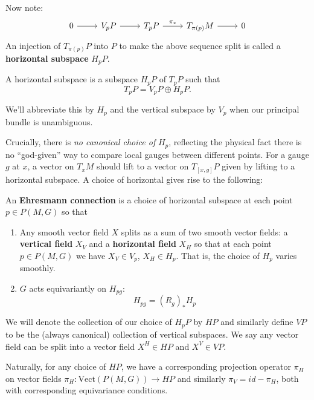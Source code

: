 		Now note:
		\[
		\begin{tikzcd}
			0 \arrow{r} & V_p P \arrow{r} & T_p P \arrow[r,"\pi_*"] & T_{\pi(p)}M \arrow{r} & 0
		\end{tikzcd}	
		\]
		An injection of $T_{\pi(p)} P$ into $P$ to make the above sequence split is called a \textbf{horizontal subspace} $H_pP$. 
		\begin{defn}
			A horizontal subspace is a subspace $H_p P$ of $T_p P$ such that
			\begin{equation}
				T_p P = V_p P \oplus H_p P.
			\end{equation}
		\end{defn}
		 We'll abbreviate this by $H_p$ and the vertical subspace by $V_p$ when our principal bundle is unambiguous.
	 
		Crucially, there is \emph{no canonical choice of} $H_p$, reflecting the physical fact there is no ``god-given'' way to compare local gauges between different points. For a gauge $g$ at $x$, a vector on $T_x M$ should lift to a vector on $T_{[x,g]} P$ given by lifting to a horizontal subspace. A choice of horizontal gives rise to the following:
		\begin{defn}
		An \textbf{Ehresmann connection} is a choice of horizontal subspace at each point $p \in P(M,G)$ so that
			\begin{enumerate}
				\item Any smooth vector field $X$ splits as a sum of two smooth vector fields: a \textbf{vertical field} $X_V$ and a \textbf{horizontal field} $X_H$ so that at each point $p \in P(M,G)$ we have $X_V \in V_p$, $X_H \in H_p$. That is, the choice of $H_p$ varies smoothly.
				\item $G$ acts equivariantly on $H_{pg}$:
				\begin{equation}
					H_{pg} = (R_{g})_* H_p
				\end{equation}
			\end{enumerate}
		\end{defn}
	
		We will denote the collection of our choice of $H_p P$ by $HP$ and similarly define $VP$ to be the (always canonical) collection of vertical subspaces. We say any vector field can be split into a vector field $X^H \in HP$ and $X^V \in VP$.
	
		Naturally, for any choice of $HP$, we have a corresponding projection operator $\pi_H$ on vector fields $\pi_H: \mathrm{Vect}(P(M,G)) \rightarrow HP$  and similarly $\pi_V = id - \pi_H$, both with corresponding equivariance conditions.
	
